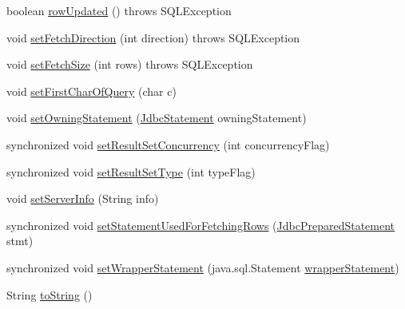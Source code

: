 \begin{DoxyCompactItemize}
\item 
boolean \mbox{\hyperlink{classcom_1_1mysql_1_1cj_1_1jdbc_1_1result_1_1_result_set_impl_a63e03522c57129ed9646cb416d935eb6}{row\+Updated}} ()  throws S\+Q\+L\+Exception 
\item 
void \mbox{\hyperlink{classcom_1_1mysql_1_1cj_1_1jdbc_1_1result_1_1_result_set_impl_a3ea6ca3a110b6384ef81a997164ca5a1}{set\+Fetch\+Direction}} (int direction)  throws S\+Q\+L\+Exception 
\item 
void \mbox{\hyperlink{classcom_1_1mysql_1_1cj_1_1jdbc_1_1result_1_1_result_set_impl_ab7cf97503b10e2179ed8a80917f04fb5}{set\+Fetch\+Size}} (int rows)  throws S\+Q\+L\+Exception 
\item 
void \mbox{\hyperlink{classcom_1_1mysql_1_1cj_1_1jdbc_1_1result_1_1_result_set_impl_ac9fac0fdfce19c2d4a1cb5ff55e03ec5}{set\+First\+Char\+Of\+Query}} (char c)
\item 
void \mbox{\hyperlink{classcom_1_1mysql_1_1cj_1_1jdbc_1_1result_1_1_result_set_impl_a057575337f0438e794595d47b68f5f8a}{set\+Owning\+Statement}} (\mbox{\hyperlink{interfacecom_1_1mysql_1_1cj_1_1jdbc_1_1_jdbc_statement}{Jdbc\+Statement}} owning\+Statement)
\item 
synchronized void \mbox{\hyperlink{classcom_1_1mysql_1_1cj_1_1jdbc_1_1result_1_1_result_set_impl_aafb1818a76b4d34d294e12585fc7966b}{set\+Result\+Set\+Concurrency}} (int concurrency\+Flag)
\item 
synchronized void \mbox{\hyperlink{classcom_1_1mysql_1_1cj_1_1jdbc_1_1result_1_1_result_set_impl_a3554bbe610ac83562dc91bf6f39c7fc2}{set\+Result\+Set\+Type}} (int type\+Flag)
\item 
void \mbox{\hyperlink{classcom_1_1mysql_1_1cj_1_1jdbc_1_1result_1_1_result_set_impl_a46781e9e02b426e28b0f384e3f06eceb}{set\+Server\+Info}} (String info)
\item 
synchronized void \mbox{\hyperlink{classcom_1_1mysql_1_1cj_1_1jdbc_1_1result_1_1_result_set_impl_a170b3778d3020705fa199ef38b1722cc}{set\+Statement\+Used\+For\+Fetching\+Rows}} (\mbox{\hyperlink{interfacecom_1_1mysql_1_1cj_1_1jdbc_1_1_jdbc_prepared_statement}{Jdbc\+Prepared\+Statement}} stmt)
\item 
synchronized void \mbox{\hyperlink{classcom_1_1mysql_1_1cj_1_1jdbc_1_1result_1_1_result_set_impl_a554db0f910df92f690ce667a5e5b5000}{set\+Wrapper\+Statement}} (java.\+sql.\+Statement \mbox{\hyperlink{classcom_1_1mysql_1_1cj_1_1jdbc_1_1result_1_1_result_set_impl_a0f31d2bda94351b8afc869362a5b96d5}{wrapper\+Statement}})
\item 
String \mbox{\hyperlink{classcom_1_1mysql_1_1cj_1_1jdbc_1_1result_1_1_result_set_impl_aaa10d9fc724924fcd9513723c7e6d6bb}{to\+String}} ()

\end{DoxyCompactItemize}
